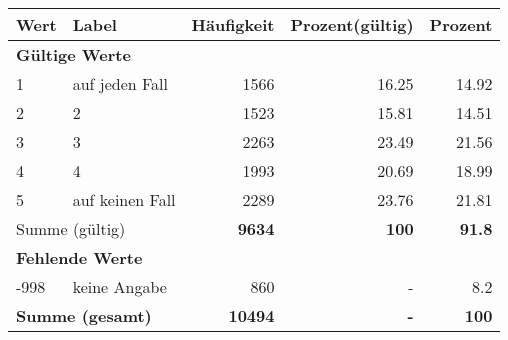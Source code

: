      \begin{longtable}{lXrrr}
     \toprule
     \textbf{Wert} & \textbf{Label} & \textbf{Häufigkeit} & \textbf{Prozent(gültig)} & \textbf{Prozent} \\
     \endhead
     \midrule
     \multicolumn{5}{l}{\textbf{Gültige Werte}}\\

     1 &
     \multicolumn{1}{X}{ auf jeden Fall   } &


       \num{1566} &
       \num[round-mode=places,round-precision=2]{16,25} &
         \num[round-mode=places,round-precision=2]{14,92} \\

     2 &
     \multicolumn{1}{X}{ 2   } &


       \num{1523} &
       \num[round-mode=places,round-precision=2]{15,81} &
         \num[round-mode=places,round-precision=2]{14,51} \\

     3 &
     \multicolumn{1}{X}{ 3   } &


       \num{2263} &
       \num[round-mode=places,round-precision=2]{23,49} &
         \num[round-mode=places,round-precision=2]{21,56} \\

     4 &
     \multicolumn{1}{X}{ 4   } &


       \num{1993} &
       \num[round-mode=places,round-precision=2]{20,69} &
         \num[round-mode=places,round-precision=2]{18,99} \\

     5 &
     \multicolumn{1}{X}{ auf keinen Fall   } &


       \num{2289} &
       \num[round-mode=places,round-precision=2]{23,76} &
         \num[round-mode=places,round-precision=2]{21,81} \\
     \midrule
     \multicolumn{2}{l}{Summe (gültig)} &
       \textbf{\num{9634}} &
     \textbf{100} &
       \textbf{\num[round-mode=places,round-precision=2]{91,8}} \\
     \multicolumn{5}{l}{\textbf{Fehlende Werte}}\\
       -998 &
       keine Angabe &
         \num{860} &
        - &
         \num[round-mode=places,round-precision=2]{8,2} \\
     \midrule
     \multicolumn{2}{l}{\textbf{Summe (gesamt)}} &
          \textbf{\num{10494}} &
        \textbf{-} &
        \textbf{100} \\
     \bottomrule
     \end{longtable}
     
